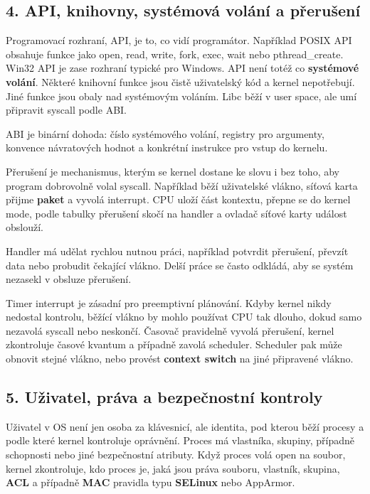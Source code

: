 \subsection*{4. API, knihovny, systémová volání a přerušení}

Programovací rozhraní, API, je to, co vidí programátor. Například POSIX API obsahuje funkce jako open, read, write, fork, exec, wait nebo pthread\_create. Win32 API je zase rozhraní typické pro Windows. API není totéž co \textbf{systémové volání}. Některé knihovní funkce jsou čistě uživatelský kód a kernel nepotřebují. Jiné funkce jsou obaly nad systémovým voláním. Libc běží v user space, ale umí připravit syscall podle ABI.

ABI je binární dohoda: číslo systémového volání, registry pro argumenty, konvence návratových hodnot a konkrétní instrukce pro vstup do kernelu.

Přerušení je mechanismus, kterým se kernel dostane ke slovu i bez toho, aby program dobrovolně volal syscall. Například běží uživatelské vlákno, síťová karta přijme \textbf{paket} a vyvolá interrupt. CPU uloží část kontextu, přepne se do kernel mode, podle tabulky přerušení skočí na handler a ovladač síťové karty událost obslouží.

Handler má udělat rychlou nutnou práci, například potvrdit přerušení, převzít data nebo probudit čekající vlákno. Delší práce se často odkládá, aby se systém nezasekl v obsluze přerušení.

Timer interrupt je zásadní pro preemptivní plánování. Kdyby kernel nikdy nedostal kontrolu, běžící vlákno by mohlo používat CPU tak dlouho, dokud samo nezavolá syscall nebo neskončí. Časovač pravidelně vyvolá přerušení, kernel zkontroluje časové kvantum a případně zavolá scheduler. Scheduler pak může obnovit stejné vlákno, nebo provést \textbf{context switch} na jiné připravené vlákno.

\subsection*{5. Uživatel, práva a bezpečnostní kontroly}

Uživatel v OS není jen osoba za klávesnicí, ale identita, pod kterou běží procesy a podle které kernel kontroluje oprávnění. Proces má vlastníka, skupiny, případně schopnosti nebo jiné bezpečnostní atributy. Když proces volá open na soubor, kernel zkontroluje, kdo proces je, jaká jsou práva souboru, vlastník, skupina, \textbf{ACL} a případně \textbf{MAC} pravidla typu \textbf{SELinux} nebo AppArmor.

